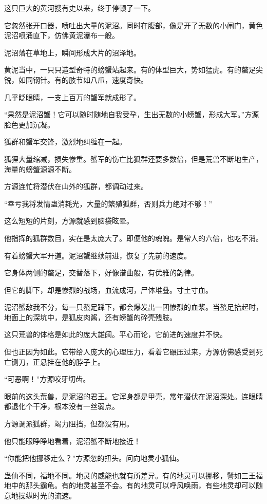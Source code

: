 \begin{this_body}
这只巨大的黄河搜有史以来，终于停顿了一下。

它忽然张开口器，喷吐出大量的泥沼。同时在腹部，像是开了无数的小闸门，黄色泥沼喷涌直下，仿佛黄泥瀑布一般。

泥沼落在草地上，瞬间形成大片的沼泽地。

黄泥当中，一只只造型奇特的螃蟹站起来。有的体型巨大，势如猛虎。有的螯足尖锐，如同钢针。有的肢节如八爪，速度奇快。

几乎眨眼睛，一支上百万的蟹军就成形了。

“果然是泥沼蟹！它可以随时随地自我受孕，生出无数的小螃蟹，形成大军。”方源脸色更加沉凝。

狐群和蟹军交锋，激烈地纠缠在一起。

狐狸大量缩减，损失惨重。蟹军的伤亡比狐群还要多数倍，但是荒兽不断地生产，海量的螃蟹源源不断。

方源连忙将潜伏在山外的狐群，都调动过来。

“幸亏我将发情蛊消耗光，大量的繁殖狐群，否则兵力绝对不够！”

这么短短的片刻，方源就感到脑袋眩晕。

他指挥的狐群数目，实在是太庞大了。即便他的魂魄。是常人的六倍，也吃不消。

有着螃蟹大军开道。泥沼蟹继续前进，恢复了先前的速度。

它身体两侧的螯足，交替落下，好像谱曲般，有优雅的韵律。

但它的脚下，却是惨烈的战场，血流成河，尸体堆叠。寸土寸血。

泥沼蟹敌我不分，每一只螯足踩下，都会爆发出一团惨烈的血浆。当螯足抬起时，地面上的深坑中，是狐皮肉酱，还有螃蟹的碎壳残肢。

这只荒兽的体格是如此的庞大雄阔。平心而论，它前进的速度并不快。

但也正因为如此。它带给人庞大的心理压力，看着它碾压过来，方源仿佛感受到死亡铡刀，正悬挂在他的脖子上。

“可恶啊！”方源咬牙切齿。

眼前的这头荒兽，是泥沼的君王。它浑身都是甲壳，常年潜伏在泥沼深处。连眼睛都退化个干净，根本没有一丝弱点。

方源调派狐群，竭力阻挡，但都没有用。

他只能眼睁睁地看着，泥沼蟹不断地接近！

“你能把他挪移走么？”方源忽的扭头。问向地灵小狐仙。

蛊仙不同，福地不同。地灵的威能也就有所差异。有的地灵可以挪移，譬如三王福地中的那头霸龟。有的地灵甚至不会。有的地灵可以呼风唤雨，有些地灵却可以随意地操纵时光的流速。


\end{this_body}
